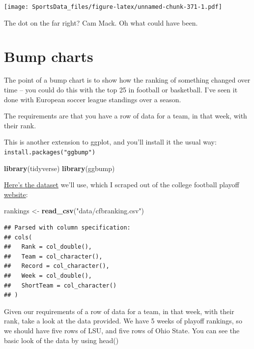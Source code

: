 \documentclass[
]{book}
\newenvironment{Shaded}{\begin{snugshade}}{\end{snugshade}}
\newcommand{\KeywordTok}[1]{\textcolor[rgb]{0.13,0.29,0.53}{\textbf{#1}}}
\newcommand{\NormalTok}[1]{#1}
\newcommand{\StringTok}[1]{\textcolor[rgb]{0.31,0.60,0.02}{#1}}
\begin{document}
\texttt{[image: SportsData\_files/figure-latex/unnamed-chunk-371-1.pdf]}

The dot on the far right? Cam Mack. Oh what could have been.

\hypertarget{bump-charts}{%
\chapter{Bump charts}\label{bump-charts}}

The point of a bump chart is to show how the ranking of something changed over time -- you could do this with the top 25 in football or basketball. I've seen it done with European soccer league standings over a season.

The requirements are that you have a row of data for a team, in that week, with their rank.

This is another extension to ggplot, and you'll install it the usual way: \texttt{install.packages("ggbump")}

\begin{Shaded}
\begin{Highlighting}[]
\KeywordTok{library}\NormalTok{(tidyverse)}
\KeywordTok{library}\NormalTok{(ggbump)}
\end{Highlighting}
\end{Shaded}

\href{https://unl.box.com/s/zgb8hv2fdzz36lcs5bcje59ri84dqjai}{Here's the dataset} we'll use, which I scraped out of the college football playoff \href{https://collegefootballplayoff.com/rankings.aspx}{website}:

\begin{Shaded}
\begin{Highlighting}[]
\NormalTok{rankings <-}\StringTok{ }\KeywordTok{read_csv}\NormalTok{(}\StringTok{"data/cfbranking.csv"}\NormalTok{)}
\end{Highlighting}
\end{Shaded}

\begin{verbatim}
## Parsed with column specification:
## cols(
##   Rank = col_double(),
##   Team = col_character(),
##   Record = col_character(),
##   Week = col_double(),
##   ShortTeam = col_character()
## )
\end{verbatim}

Given our requirements of a row of data for a team, in that week, with their rank, take a look at the data provided. We have 5 weeks of playoff rankings, so we should have five rows of LSU, and five rows of Ohio State. You can see the basic look of the data by using head()
\end{document}
